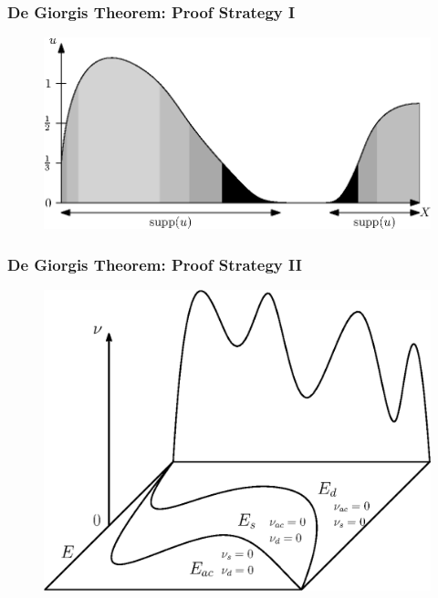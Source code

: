 \documentclass[10pt, hyperref={hidelinks}]{beamer}
\begin{document}
    \begin{frame}
        \frametitle{De Giorgis Theorem: Proof Strategy I}

        \begin{figure}[!hbtp]
            \centering
            \includegraphics[width=0.75\linewidth]{../notes/img/degiorgi.eps}
        \end{figure}
    \end{frame}

    \begin{frame}
        \frametitle{De Giorgis Theorem: Proof Strategy II}
    
        \begin{figure}[!hbtp]
            \centering
            \includegraphics[width=0.7\linewidth]{../notes/img/degiorgi2.eps}
        \end{figure}
    \end{frame}
\end{document}
